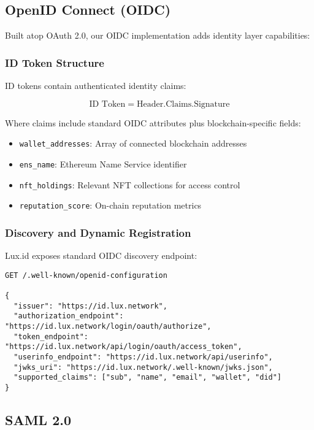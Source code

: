 \documentclass[11pt,a4paper]{article}
\begin{document}
\subsection{OpenID Connect (OIDC)}

Built atop OAuth 2.0, our OIDC implementation adds identity layer capabilities:

\subsubsection{ID Token Structure}

ID tokens contain authenticated identity claims:

\begin{equation}
    \text{ID Token} = \text{Header}.\text{Claims}.\text{Signature}
\end{equation}

Where claims include standard OIDC attributes plus blockchain-specific fields:

\begin{itemize}
    \item \texttt{wallet\_addresses}: Array of connected blockchain addresses
    \item \texttt{ens\_name}: Ethereum Name Service identifier
    \item \texttt{nft\_holdings}: Relevant NFT collections for access control
    \item \texttt{reputation\_score}: On-chain reputation metrics
\end{itemize}

\subsubsection{Discovery and Dynamic Registration}

Lux.id exposes standard OIDC discovery endpoint:

\begin{lstlisting}
GET /.well-known/openid-configuration

{
  "issuer": "https://id.lux.network",
  "authorization_endpoint": "https://id.lux.network/login/oauth/authorize",
  "token_endpoint": "https://id.lux.network/api/login/oauth/access_token",
  "userinfo_endpoint": "https://id.lux.network/api/userinfo",
  "jwks_uri": "https://id.lux.network/.well-known/jwks.json",
  "supported_claims": ["sub", "name", "email", "wallet", "did"]
}
\end{lstlisting}

\subsection{SAML 2.0}
\end{document}
